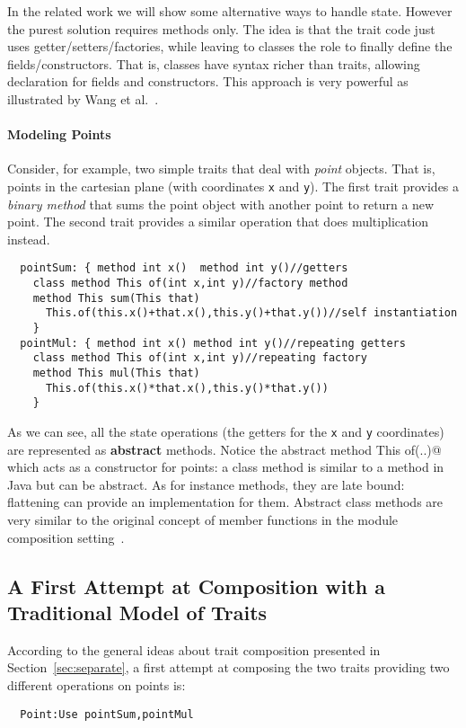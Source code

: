 In the related work we will show some alternative ways to handle
state.  However the purest solution requires methods only. The idea is
that the trait code just uses getter/setters/factories, while leaving
to classes the role to finally define the fields/constructors. That
is, classes have syntax richer than traits, allowing
declaration for fields and constructors.  This approach is very
powerful as illustrated by Wang et al.~\cite{wang2016classless}.

\paragraph{Modeling Points} Consider, for example, two simple 
traits that deal with \emph{point} objects. That is, points
in the cartesian plane (with coordinates \lstinline{x} and
\lstinline{y}). The first trait provides a \emph{binary method} that 
sums the point object with another point to return a new point. 
The second trait provides a similar operation that does multiplication 
instead.
\saveSpace 
\begin{lstlisting}
  pointSum: { method int x()  method int y()//getters
    class method This of(int x,int y)//factory method
    method This sum(This that)
      This.of(this.x()+that.x(),this.y()+that.y())//self instantiation
    }
  pointMul: { method int x() method int y()//repeating getters
    class method This of(int x,int y)//repeating factory
    method This mul(This that)
      This.of(this.x()*that.x(),this.y()*that.y())
    }
\end{lstlisting}
\saveSpace
\noindent As we can see, all the state operations (the getters for the 
\lstinline{x} and \lstinline{y} coordinates) are represented as {\bf abstract} methods.
Notice the abstract \Q@class method This of(..)@ which acts as a constructor
for points:
a class method is similar to a \Q@static@ method in Java but can be abstract. 
As for instance methods, they are late bound:  flattening can provide an implementation for them.
Abstract class methods are very similar to the original concept of member functions in the module composition setting~\cite{ancona2002calculus}.

\subsection{A First Attempt at Composition with a Traditional Model of
Traits}
According to the general ideas about trait composition presented in
Section~\ref{sec:separate}, a first attempt at composing the two traits providing
two different operations on points is:
\saveSpace\begin{lstlisting}
  Point:Use pointSum,pointMul
\end{lstlisting}  \saveSpace


